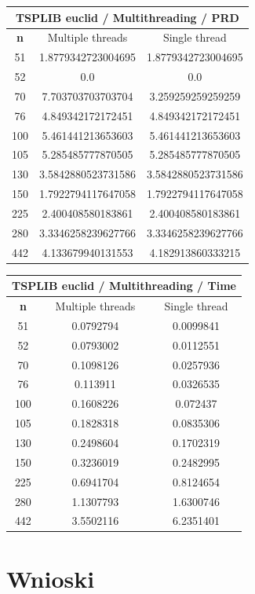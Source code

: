 \documentclass{article}
\begin{document}
\begin{center}
\begin{tabular}{|c|c|c|}
\hline
\multicolumn{3}{|c|}{\textbf{TSPLIB euclid / Multithreading / PRD}}\\
\hline
\textbf{n} & Multiple threads & Single thread\\
\hline
51 & 1.8779342723004695 & 1.8779342723004695\\
\hline
52 & 0.0 & 0.0\\
\hline
70 & 7.703703703703704 & 3.259259259259259\\
\hline
76 & 4.849342172172451 & 4.849342172172451\\
\hline
100 & 5.461441213653603 & 5.461441213653603\\
\hline
105 & 5.285485777870505 & 5.285485777870505\\
\hline
130 & 3.5842880523731586 & 3.5842880523731586\\
\hline
150 & 1.7922794117647058 & 1.7922794117647058\\
\hline
225 & 2.400408580183861 & 2.400408580183861\\
\hline
280 & 3.3346258239627766 & 3.3346258239627766\\
\hline
442 & 4.133679940131553 & 4.182913860333215\\
\hline
\end{tabular}
\end{center}


\begin{center}
\begin{tabular}{|c|c|c|}
\hline
\multicolumn{3}{|c|}{\textbf{TSPLIB euclid / Multithreading / Time}}\\
\hline
\textbf{n} & Multiple threads & Single thread\\
\hline
51 & 0.0792794 & 0.0099841\\
\hline
52 & 0.0793002 & 0.0112551\\
\hline
70 & 0.1098126 & 0.0257936\\
\hline
76 & 0.113911 & 0.0326535\\
\hline
100 & 0.1608226 & 0.072437\\
\hline
105 & 0.1828318 & 0.0835306\\
\hline
130 & 0.2498604 & 0.1702319\\
\hline
150 & 0.3236019 & 0.2482995\\
\hline
225 & 0.6941704 & 0.8124654\\
\hline
280 & 1.1307793 & 1.6300746\\
\hline
442 & 3.5502116 & 6.2351401\\
\hline
\end{tabular}
\end{center}



\section{Wnioski}
\end{document}
